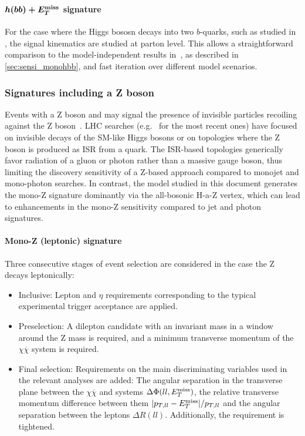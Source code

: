 \paragraph{$\boldsymbol{h(bb)+E_T^\mathrm{miss}}$ signature} For the case where the Higgs bososn decays into two $b$-quarks, such as studied in \cite{Aaboud:2017yqz}, the signal kinematics are studied at parton level. 
This allows a straightforward comparison to the model-independent results in~\cite{Aaboud:2017yqz}, as described in \autoref{sec:sensi_monohbb}, and fast iteration over different model scenarios. 

\subsubsection{Signatures including a Z boson}

Events with a Z boson and \MET may signal the presence of invisible particles recoiling against the Z boson~\cite{Carpenter:2012rg,Bell:2012rg}. 
LHC searches (e.g.~\cite{Aaboud:2017bja,Sirunyan:2017qfc} for the most recent ones) have focused on invisible decays of the SM-like Higgs bosons or on topologies where the Z boson is produced as ISR from a quark. 
The ISR-based topologies generically favor radiation of a gluon or photon rather than a massive gauge boson, thus limiting the discovery sensitivity of a Z-based approach compared to monojet and mono-photon searches. 
In contrast, the model studied in this document generates the mono-Z signature dominantly via the all-bosonic H-a-Z vertex, which can lead to enhancements in the mono-Z sensitivity compared to jet and photon signatures. 

\paragraph{Mono-Z (leptonic) signature}

Three consecutive stages of event selection are considered in the case the Z decays leptonically:

\begin{itemize}
\item Inclusive: Lepton \pt and $\eta$ requirements corresponding to the typical experimental trigger acceptance are applied.
\item Preselection: A dilepton candidate with an invariant mass in a window around the Z mass is required, and a minimum transverse momentum of the $\chi\overline{\chi}$ system is required.
\item Final selection: Requirements on the main discriminating variables used in the relevant analyses are added: The angular separation in the transverse plane between the $\chi\overline{\chi}$ and \lp\lm systems $\Delta\Phi(ll,E_T^\mathrm{miss})$, the relative transverse momentum difference between them $|p_{T,ll} - E_T^\mathrm{miss}|/p_{T,ll}$ and the angular separation between the leptons $\Delta R(ll)$. Additionally, the \MET requirement is tightened.
\end{itemize}

